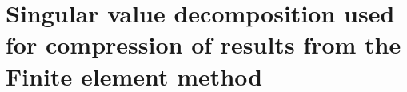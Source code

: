 \chapter{Singular value decomposition used for compression of results from the Finite element method}
\label{appendix-SVD}
